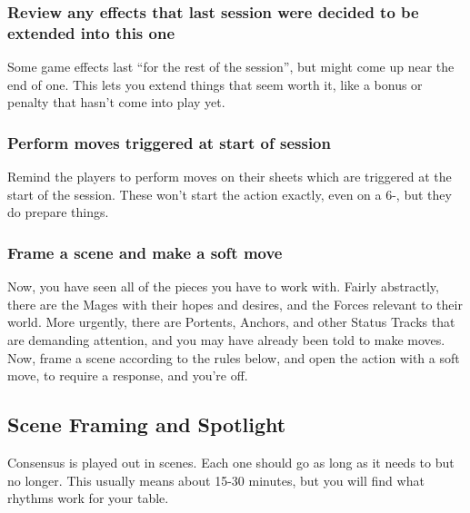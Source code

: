 \documentclass[
  oneside,
  statementpaper,
  9pt]{memoir}
\begin{document}
\hypertarget{review-any-effects-that-last-session-were-decided-to-be-extended-into-this-one}{%
\subsubsection{Review any effects that last session were decided to be
extended into this
one}\label{review-any-effects-that-last-session-were-decided-to-be-extended-into-this-one}}

Some game effects last ``for the rest of the session'', but might come
up near the end of one. This lets you extend things that seem worth it,
like a bonus or penalty that hasn't come into play yet.

\hypertarget{perform-moves-triggered-at-start-of-session}{%
\subsubsection{Perform moves triggered at start of
session}\label{perform-moves-triggered-at-start-of-session}}

Remind the players to perform moves on their sheets which are triggered
at the start of the session. These won't start the action exactly, even
on a 6-, but they do prepare things.

\hypertarget{frame-a-scene-and-make-a-soft-move}{%
\subsubsection{Frame a scene and make a soft
move}\label{frame-a-scene-and-make-a-soft-move}}

Now, you have seen all of the pieces you have to work with. Fairly
abstractly, there are the Mages with their hopes and desires, and the
Forces relevant to their world. More urgently, there are Portents,
Anchors, and other Status Tracks that are demanding attention, and you
may have already been told to make moves. Now, frame a scene according
to the rules below, and open the action with a soft move, to require a
response, and you're off.

\hypertarget{scene-framing-and-spotlight}{%
\subsection{Scene Framing and
Spotlight}\label{scene-framing-and-spotlight}}

Consensus is played out in scenes. Each one should go as long as it
needs to but no longer. This usually means about 15-30 minutes, but you
will find what rhythms work for your table.
\end{document}
